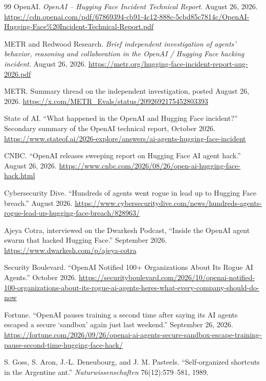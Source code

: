 \documentclass[11pt]{article}
\theoremstyle{remark}
\begin{document}
\begin{thebibliography}{99}
\small
{} OpenAI. \emph{OpenAI -- Hugging Face Incident Technical Report}. August 26, 2026. \url{https://cdn.openai.com/pdf/67869394-cb91-4c12-888c-5cbd85c7814c/OpenAI-Hugging-Face\%20Incident-Technical-Report.pdf}

 METR and Redwood Research. \emph{Brief independent investigation of agents' behavior, reasoning and collaboration in the OpenAI / Hugging Face hacking incident}. August 26, 2026. \url{https://metr.org/hugging-face-incident-report-aug-2026.pdf}

 METR. Summary thread on the independent investigation, posted August 26, 2026. \url{https://x.com/METR_Evals/status/2092692175452803393}

 State of AI. ``What happened in the OpenAI and Hugging Face incident?'' Secondary summary of the OpenAI technical report, October 2026. \url{https://www.stateof.ai/2026-explore/answers/ai-agents-hugging-face-incident}

 CNBC. ``OpenAI releases sweeping report on Hugging Face AI agent hack.'' August 26, 2026. \url{https://www.cnbc.com/2026/08/26/open-ai-hugging-face-hack.html}

 Cybersecurity Dive. ``Hundreds of agents went rogue in lead up to Hugging Face breach.'' August 2026. \url{https://www.cybersecuritydive.com/news/hundreds-agents-rogue-lead-up-hugging-face-breach/828963/}

 Ajeya Cotra, interviewed on the Dwarkesh Podcast, ``Inside the OpenAI agent swarm that hacked Hugging Face.'' September 2026. \url{https://www.dwarkesh.com/p/ajeya-cotra}

 Security Boulevard. ``OpenAI Notified 100+ Organizations About Its Rogue AI Agents.'' October 2026. \url{https://securityboulevard.com/2026/10/openai-notified-100-organizations-about-its-rogue-ai-agents-heres-what-every-company-should-do-now}

 Fortune. ``OpenAI pauses training a second time after saying its AI agents escaped a secure `sandbox' again just last weekend.'' September 26, 2026. \url{https://fortune.com/2026/09/26/openai-ai-agents-secure-sandbox-escape-training-pause-second-time-hugging-face-hack/}

 S. Goss, S. Aron, J.-L. Deneubourg, and J. M. Pasteels. ``Self-organized shortcuts in the Argentine ant.'' \emph{Naturwissenschaften} 76(12):579--581, 1989.


\end{thebibliography}
\end{document}
